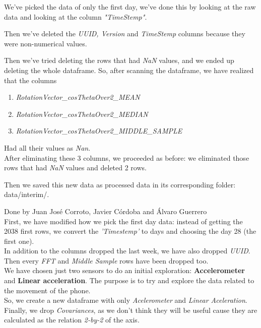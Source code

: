 \documentclass[idxtotoc,hyperref,openany]{labbook} %
\begin{document}


We've picked the data of only the first day, we've done this by looking at the raw data and looking at the column \textit{"TimeStemp"}.

Then we've deleted the \textit{UUID, Version} and \textit{TimeStemp} columns because they were non-numerical values.

Then we've tried deleting the rows that had \textit{NaN} values, and we ended up deleting the whole dataframe. So, after scanning the dataframe, we have realized that the columns 
\begin{enumerate}
\item \textit{RotationVector\_cosThetaOver2\_MEAN}
\item \textit{RotationVector\_cosThetaOver2\_MEDIAN}
\item \textit{RotationVector\_cosThetaOver2\_MIDDLE\_SAMPLE}
\end{enumerate}
Had all their values as \textit{Nan}.
\\
After eliminating these 3 columns, we proceeded as before: we eliminated those rows that had \textit{NaN} values and deleted 2 rows.

Then we saved this new data as processed data in its corresponding folder: data/interim/.




Done by Juan Jos\'e Corroto, Javier C\'ordoba and \'Alvaro Guerrero\\

First, we have modified how we pick the first day data: instead of getting the 2038 first rows, we convert the \textit{'Timestemp'} to days and choosing the day 28 (the first one).\\

In addition to the columns dropped the last week, we have also dropped \textit{UUID}. Then every \textit{FFT} and \textit{Middle Sample} rows have been dropped too.\\

We have chosen just two sensors to do an initial exploration: \textbf{Accelerometer} and \textbf{Linear acceleration}. The purpose is to try and explore the data related to the movement of the phone.\\
So, we create a new dataframe with only \textit{Acelerometer} and \textit{Linear Aceleration}. Finally, we drop \textit{Covariances}, as we don't think they will be useful cause they are calculated as the relation \textit{2-by-2} of the axis.
\end{document}
